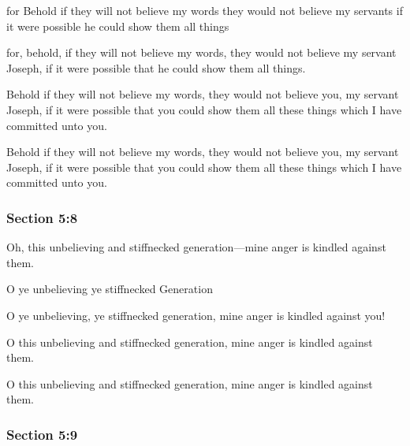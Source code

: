		\begin{framed}
		\scriptsize
			\begin{compactdesc}
				\item[JSP] for Behold if they will not believe my words they would not believe my servants if it were possible he could show them all things
				\item[RB1] [\textit{missing}]
				\item[BC] for, behold, if they will not believe my words, they would not believe my servant Joseph, if it were possible that he could show them all things.
				\item[DC 1835] Behold if they will not believe my words, they would not believe you, my servant Joseph, if it were possible that you could show them all these things which I have committed unto you.
				\item[DC 1844] Behold if they will not believe my words, they would not believe you, my servant Joseph, if it were possible that you could show them all these things which I have committed unto you.
			\end{compactdesc}
		\end{framed}

	\subsubsection{Section 5:8} %
		\label{DC5-8}

		Oh, this unbelieving and stiffnecked generation---mine anger is kindled against them.

		\begin{framed}
		\scriptsize
			\begin{compactdesc}
				\item[JSP] O ye unbelieving ye stiffnecked Generation
				\item[RB1] [\textit{missing}]
				\item[BC] O ye unbelieving, ye stiffnecked generation, mine anger is kindled against you!
				\item[DC 1835] O this unbelieving and stiffnecked generation, mine anger is kindled against them.
				\item[DC 1844] O this unbelieving and stiffnecked generation, mine anger is kindled against them.
			\end{compactdesc}
		\end{framed}

	\subsubsection{Section 5:9} %
		\label{DC5-9}

